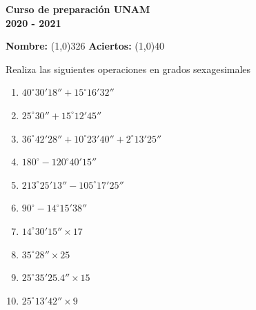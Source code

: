 \documentclass[12pt]{article}
\begin{document}
\begin{center}
  \textbf{ \Large{Curso de preparación UNAM} \\[2mm] 
  \large{2020 - 2021}}	
\end{center}

\begin{flushleft}	
  \textbf{Nombre: }
  \line(1,0){326}\;\;
  \textbf{Aciertos: }
  \line(1,0){40}\\  
\end{flushleft}	
\noindent
Realiza las siguientes operaciones en grados sexagesimales
\begin{multicols*}{2}
  \begin{enumerate}[label=\Alph*.]
    \setlength\itemsep{6cm}
    \item $40^\circ 30' 18'' + 15^\circ 16' 32''$
    \item $25^\circ 30'' + 15^\circ 12' 45''$
    \item $36^\circ 42' 28'' + 10^\circ 23' 40'' + 2^\circ 13' 25''$
    \item $180^\circ - 120^\circ 40' 15''$
    \item $213^\circ 25' 13'' - 105^\circ 17' 25''$
    \item $90^\circ - 14^\circ 15' 38''$
    \item $14^\circ 30' 15'' \times 17$
    \item $35^\circ 28'' \times 25$
    \item $25^\circ 35' 25.4'' \times 15$
    \item $25^\circ 13' 42'' \times 9$
  \end{enumerate}
\end{multicols*}
\end{document}
